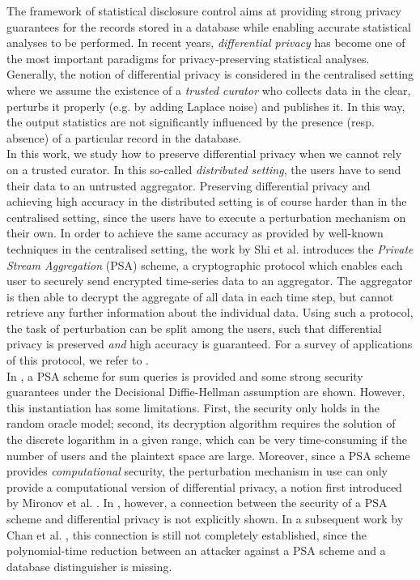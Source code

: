 \documentclass[10pt]{extarticle}
\begin{document}
The framework of statistical disclosure control aims at providing strong privacy guarantees for the records stored in a database while enabling accurate statistical analyses to be performed. In recent years, \textit{differential privacy} has become one of the most important paradigms for privacy-preserving statistical analyses. Generally, the notion of differential privacy is considered in the centralised setting where we assume the existence of a \textit{trusted curator} \cite{16, 24, 8, 9} who collects data in the clear, perturbs it properly (e.g. by adding Laplace noise) and publishes it. In this way, the output statistics are not significantly influenced by the presence (resp. absence) of a particular record in the database.\\
In this work, we study how to preserve differential privacy when we cannot rely on a trusted curator. In this so-called \textit{distributed setting}, the users have to send their data to an untrusted aggregator. Preserving differential privacy and achieving high accuracy in the distributed setting is of course harder than in the centralised setting, since the users have to execute a perturbation mechanism on their own. In order to achieve the same accuracy as provided by well-known techniques in the centralised setting, the work by Shi et al. \cite{2} introduces the \textit{Private Stream Aggregation} (PSA) scheme, a cryptographic protocol which enables each user to securely send encrypted time-series data to an aggregator. The aggregator is then able to decrypt the aggregate of all data in each time step, but cannot retrieve any further information about the individual data. Using such a protocol, the task of perturbation can be split among the users, such that differential privacy is preserved \textit{and} high accuracy is guaranteed. For a survey of applications of this protocol, we refer to \cite{2}.\\
In \cite{2}, a PSA scheme for sum queries is provided and some strong security guarantees under the Decisional Diffie-Hell\-man assumption are shown. However, this instantiation has some limitations. First, the security only holds in the random oracle model; second, its decryption algorithm requires the solution of the discrete logarithm in a given range, which can be very time-consuming if the number of users and the plaintext space are large. Moreover, since a PSA scheme provides \textit{computational} security, the perturbation mechanism in use can only provide a computational version of differential privacy, a notion first introduced by Mironov et al. \cite{15}. In \cite{2}, however, a connection between the security of a PSA scheme and differential privacy is not explicitly shown. In a subsequent work by Chan et al. \cite{3}, this connection is still not completely established, since the polynomial-time reduction between an attacker against a PSA scheme and a database distinguisher is missing.\\
\end{document}
